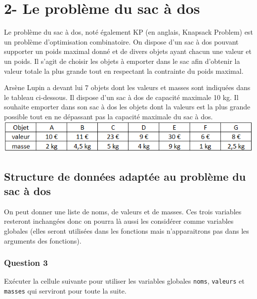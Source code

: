 \documentclass[
  paper=a4,
  ,captions=tableheading
]{scrartcl}
\begin{document}
\hypertarget{2--le-probluxe8me-du-sac-uxe0-dos}{%
\section{2- Le problème du sac à
dos}\label{2--le-probluxe8me-du-sac-uxe0-dos}}

Le problème du sac à dos, noté également KP (en anglais, Knapsack
Problem) est un problème d'optimisation combinatoire. On dispose d'un
sac à dos pouvant supporter un poids maximal donné et de divers objets
ayant chacun une valeur et un poids. Il s'agit de choisir les objets à
emporter dans le sac afin d'obtenir la valeur totale la plus grande tout
en respectant la contrainte du poids maximal.

Arsène Lupin a devant lui 7 objets dont les valeurs et masses sont
indiquées dans le tableau ci-dessous. Il dispose d'un sac à dos de
capacité maximale 10 kg. Il souhaite emporter dans son sac à dos les
objets dont la valeurs est la plus grande possible tout en ne dépassant
pas la capacité maximale du sac à dos.\\
\includegraphics{images/2-image.png}

\hypertarget{structure-de-donnuxe9es-adaptuxe9e-au-probluxe8me-du-sac-uxe0-dos}{%
\subsection{Structure de données adaptée au problème du sac à
dos}\label{structure-de-donnuxe9es-adaptuxe9e-au-probluxe8me-du-sac-uxe0-dos}}

On peut donner une liste de noms, de valeurs et de masses. Ces trois
variables resteront inchangées donc on pourra là aussi les considérer
comme variables globales (elles seront utilisées dans les fonctions mais
n'apparaitrons pas dans les arguments des fonctions).

\hypertarget{question-3}{%
\subsubsection{Question 3}\label{question-3}}

Exécuter la cellule suivante pour utiliser les variables globales
\texttt{noms}, \texttt{valeurs} et \texttt{masses} qui serviront pour
toute la suite.
\end{document}
